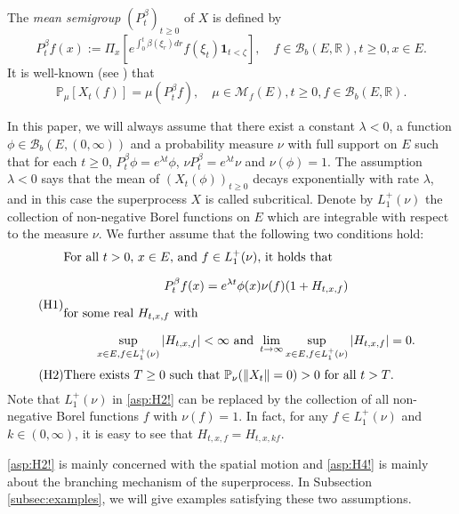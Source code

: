 \documentclass[12pt,a4paper]{amsart}
\numberwithin{equation}{section}
\theoremstyle{plain}
\theoremstyle{definition}
\theoremstyle{remark}
\begin{document}
	The \emph{mean semigroup} $(P_t^\beta)_{t\geq 0}$ of $X$ is defined by
\begin{equation}
	P_t^\beta f(x)
	:= \Pi_x\left[e^{\int_0^t \beta(\xi_r)dr }f(\xi_t)  \mathbf 1_{t < \zeta}\right],
	\quad f\in \mathcal B_b(E,\mathbb R), t\geq 0, x\in E.
\end{equation}
	It is well-known (see \cite[Proposition 2.27]{Li2011MeasureValued}) that
\begin{equation} \label{Fact:M!}
	\mathbb P_\mu[X_t(f)] = \mu (P_t^\beta f),
	\quad \mu \in \mathcal M_f(E), t\geq 0, f \in \mathcal B_b(E,\mathbb R).
\end{equation}	

	In this paper, we will always assume that there exist a constant $\lambda<0$, a function $\phi \in \mathcal B_b(E,(0,\infty))$ and a probability measure
    $\nu$ with full support on $E$ such that for each $t\geq 0$, $P_t^\beta \phi = e^{\lambda t}\phi$, $\nu P_t^\beta = e^{\lambda t} \nu$ and $\nu(\phi) = 1$.
	The assumption $\lambda<0$ says that the mean of $(X_t(\phi))_{t\geq 0}$
	decays exponentially with rate $\lambda$, and in this case the superprocess $X$ is called subcritical.
	Denote by $L_1^+(\nu)$ the collection of non-negative Borel functions on $E$ which are integrable with respect to the measure $\nu$.
	We further assume that the following two conditions  hold:
\begin{equation}
\label{asp:H2!} \tag{H1}
\begin{minipage}{0.9\textwidth}
	For all $t>0$, $x\in E$, and $f\in L_1^+(\nu)$, it holds that
	 \[ P_t^\beta f(x) = e^{\lambda t} \phi(x) \nu(f) (1+ H_{t,x,f})\]
		for some real $H_{t,x,f}$ with
	\[\sup_{x\in E, f\in L_1^+(\nu)} |H_{t,x,f}| < \infty
	\mbox{ and }
	\lim_{t\to \infty} \sup_{x\in E, f\in L_1^+(\nu)} |H_{t,x,f}| = 0.\]
\end{minipage}
\end{equation}
\begin{equation}
\label{asp:H4!} \tag{H2}
\begin{minipage}{0.9\textwidth}
	There exists  $T\geq 0$ such that $\mathbb P_\nu(\|X_t\| = 0)>0$ for all $t> T$.
\end{minipage}
\end{equation}
	Note that $L_1^+(\nu)$ in \eqref{asp:H2!} can be replaced by the collection of all non-negative Borel functions $f$ with $\nu(f) = 1$.
	In fact, for any $f\in L_1^+(\nu)$ and $k \in (0,\infty)$, it is easy to see that $H_{t,x,f} = H_{t,x,kf}$.

	\eqref{asp:H2!} is mainly concerned with the spatial motion and \eqref{asp:H4!} is mainly about the branching mechanism of the superprocess.
	In Subsection \ref{subsec:examples}, we will give examples satisfying these two assumptions.
\end{document}
